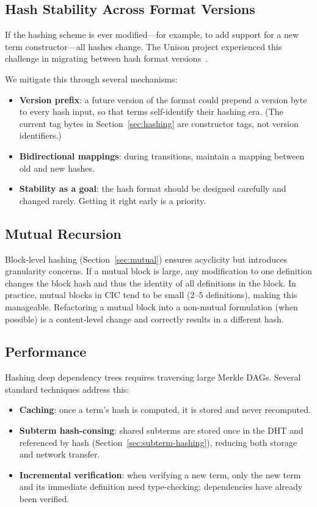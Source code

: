 \documentclass[11pt]{article}
\theoremstyle{definition}
\theoremstyle{plain}
\theoremstyle{remark}
\begin{document}
\subsection{Hash Stability Across Format Versions}
\label{sec:hash-stability}

If the hashing scheme is ever modified---for example, to add support for a new term
constructor---all hashes change.
The Unison project experienced this challenge in migrating between hash format versions~\cite{unison}.

We mitigate this through several mechanisms:
\begin{itemize}[nosep]
  \item \textbf{Version prefix}: a future version of the format could prepend a version byte to
    every hash input, so that terms self-identify their hashing era.
    (The current tag bytes in Section~\ref{sec:hashing} are constructor tags, not version identifiers.)
  \item \textbf{Bidirectional mappings}: during transitions, maintain a mapping between old and new hashes.
  \item \textbf{Stability as a goal}: the hash format should be designed carefully and changed rarely.
    Getting it right early is a priority.
\end{itemize}

\subsection{Mutual Recursion}
\label{sec:mutual-challenges}

Block-level hashing (Section~\ref{sec:mutual}) ensures acyclicity but introduces granularity
concerns.
If a mutual block is large, any modification to one definition changes the block hash and
thus the identity of all definitions in the block.
In practice, mutual blocks in CIC tend to be small (2--5 definitions), making this manageable.
Refactoring a mutual block into a non-mutual formulation (when possible) is a content-level
change and correctly results in a different hash.

\subsection{Performance}
\label{sec:performance}

Hashing deep dependency trees requires traversing large Merkle DAGs.
Several standard techniques address this:
\begin{itemize}[nosep]
  \item \textbf{Caching}: once a term's hash is computed, it is stored and never recomputed.
  \item \textbf{Subterm hash-consing}: shared subterms are stored once in the DHT and referenced
    by hash (Section~\ref{sec:subterm-hashing}), reducing both storage and network transfer.
  \item \textbf{Incremental verification}: when verifying a new term, only the new term and its
    immediate definition need type-checking; dependencies have already been verified.
\end{itemize}
\end{document}
